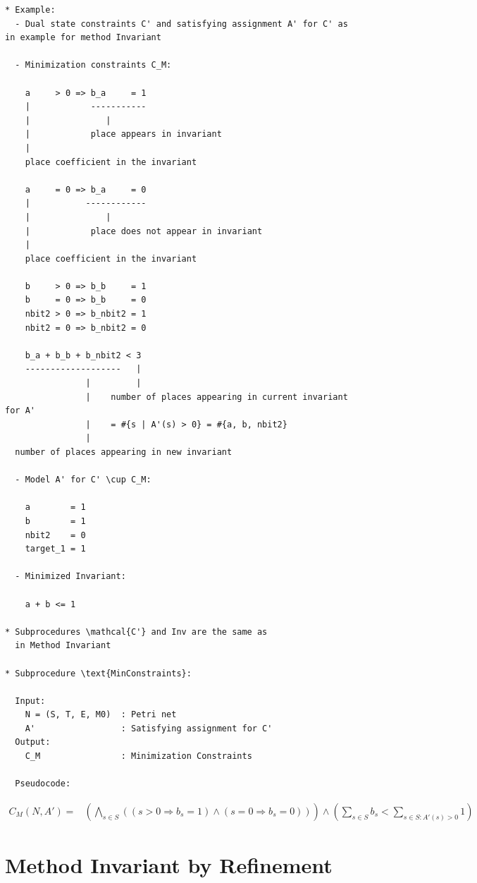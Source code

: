 \documentclass{llncs}
\begin{document}
\newpage
\begin{verbatim}
* Example:
  - Dual state constraints C' and satisfying assignment A' for C' as in example for method Invariant

  - Minimization constraints C_M:

    a     > 0 => b_a     = 1
    |            -----------
    |               |
    |            place appears in invariant
    |
    place coefficient in the invariant

    a     = 0 => b_a     = 0
    |           ------------
    |               |
    |            place does not appear in invariant
    |
    place coefficient in the invariant

    b     > 0 => b_b     = 1
    b     = 0 => b_b     = 0
    nbit2 > 0 => b_nbit2 = 1
    nbit2 = 0 => b_nbit2 = 0

    b_a + b_b + b_nbit2 < 3
    -------------------   |
                |         |
                |    number of places appearing in current invariant for A'
                |    = #{s | A'(s) > 0} = #{a, b, nbit2}
                |
  number of places appearing in new invariant
  
  - Model A' for C' \cup C_M:

    a        = 1
    b        = 1
    nbit2    = 0
    target_1 = 1
    
  - Minimized Invariant:

    a + b <= 1
    
* Subprocedures \mathcal{C'} and Inv are the same as
  in Method Invariant

* Subprocedure \text{MinConstraints}:

  Input:
    N = (S, T, E, M0)  : Petri net
    A'                 : Satisfying assignment for C'
  Output:
    C_M                : Minimization Constraints

  Pseudocode:

\end{verbatim}

\begin{align*}
  C_M(N, A') =& \left( \bigwedge_{s \in S} \left(
      (s > 0 \Rightarrow b_s = 1) \land (s = 0 \Rightarrow b_s = 0)
    \right) \right) \land
    \left( \sum_{s \in S} b_s < \sum_{s \in S : A'(s) > 0} 1 \right)
\end{align*}

\newpage

\section{Method Invariant by Refinement}
\end{document}
